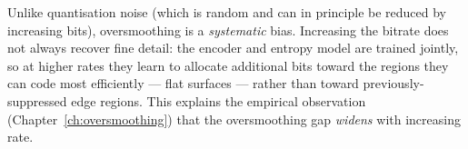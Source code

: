 Unlike quantisation noise (which is random and can in principle be reduced
by increasing bits), oversmoothing is a \emph{systematic} bias.
Increasing the bitrate does not always recover fine detail: the encoder
and entropy model are trained jointly, so at higher rates they learn to
allocate additional bits toward the regions they can code most efficiently
--- flat surfaces --- rather than toward previously-suppressed edge regions.
This explains the empirical observation (Chapter~\ref{ch:oversmoothing})
that the oversmoothing gap \emph{widens} with increasing rate.



